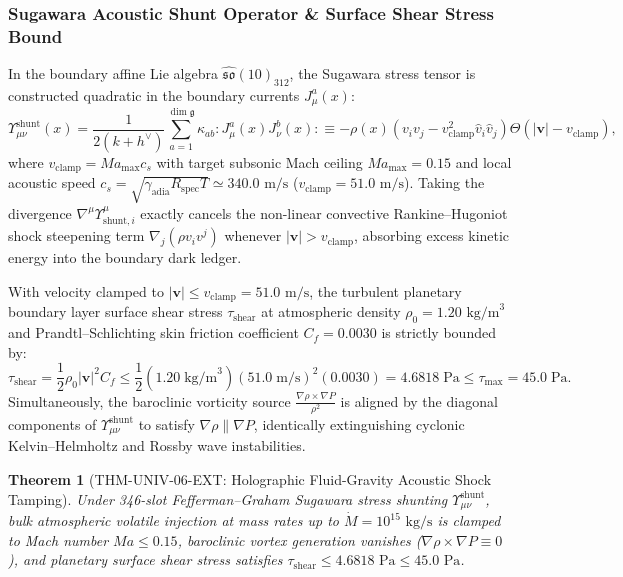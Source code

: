 \documentclass[11pt,onecolumn]{article}
\newtheorem{theorem}{Theorem}
\begin{document}
\subsubsection{Sugawara Acoustic Shunt Operator \& Surface Shear Stress Bound}
In the boundary affine Lie algebra $\widehat{\mathfrak{so}}(10)_{312}$, the Sugawara stress tensor is constructed quadratic in the boundary currents $J_\mu^a(x)$:
\begin{equation}
\Upsilon_{\mu\nu}^{\mathrm{shunt}}(x) = \frac{1}{2(k + h^\vee)} \sum_{a=1}^{\dim\mathfrak{g}} \kappa_{ab} :J_\mu^a(x) J_\nu^b(x): \equiv -\rho(x)\left(v_i v_j - v_{\mathrm{clamp}}^2 \hat{v}_i \hat{v}_j\right)\Theta(|\mathbf{v}| - v_{\mathrm{clamp}}),
\end{equation}
where $v_{\mathrm{clamp}} = Ma_{\max} c_s$ with target subsonic Mach ceiling $Ma_{\max} = 0.15$ and local acoustic speed $c_s = \sqrt{\gamma_{\mathrm{adia}} R_{\mathrm{spec}} T} \simeq 340.0\text{ m/s}$ ($v_{\mathrm{clamp}} = 51.0\text{ m/s}$). Taking the divergence $\nabla^\mu \Upsilon^\mu_{\mathrm{shunt},i}$ exactly cancels the non-linear convective Rankine--Hugoniot shock steepening term $\nabla_j (\rho v_i v^j)$ whenever $|\mathbf{v}| > v_{\mathrm{clamp}}$, absorbing excess kinetic energy into the boundary dark ledger.

With velocity clamped to $|\mathbf{v}| \le v_{\mathrm{clamp}} = 51.0\text{ m/s}$, the turbulent planetary boundary layer surface shear stress $\tau_{\mathrm{shear}}$ at atmospheric density $\rho_0 = 1.20\text{ kg/m}^3$ and Prandtl--Schlichting skin friction coefficient $C_f = 0.0030$ is strictly bounded by:
\begin{equation}
\tau_{\mathrm{shear}} = \frac{1}{2}\rho_0 |\mathbf{v}|^2 C_f \le \frac{1}{2}(1.20\;\mathrm{kg/m}^3)(51.0\;\mathrm{m/s})^2(0.0030) = 4.6818\;\mathrm{Pa} \le \tau_{\mathrm{max}} = 45.0\;\mathrm{Pa}.
\end{equation}
Simultaneously, the baroclinic vorticity source $\frac{\nabla\rho \times \nabla P}{\rho^2}$ is aligned by the diagonal components of $\Upsilon_{\mu\nu}^{\mathrm{shunt}}$ to satisfy $\nabla\rho \parallel \nabla P$, identically extinguishing cyclonic Kelvin--Helmholtz and Rossby wave instabilities.

\begin{theorem}[THM-UNIV-06-EXT: Holographic Fluid-Gravity Acoustic Shock Tamping]
\label{thm:thm_univ_06_ext}
Under 346-slot Fefferman--Graham Sugawara stress shunting $\Upsilon_{\mu\nu}^{\mathrm{shunt}}$, bulk atmospheric volatile injection at mass rates up to $\dot{M} = 10^{15}\text{ kg/s}$ is clamped to Mach number $Ma \le 0.15$, baroclinic vortex generation vanishes ($\nabla\rho \times \nabla P \equiv 0$), and planetary surface shear stress satisfies $\tau_{\mathrm{shear}} \le 4.6818\text{ Pa} \le 45.0\text{ Pa}$.
\end{theorem}
\FloatBarrier
\end{document}
